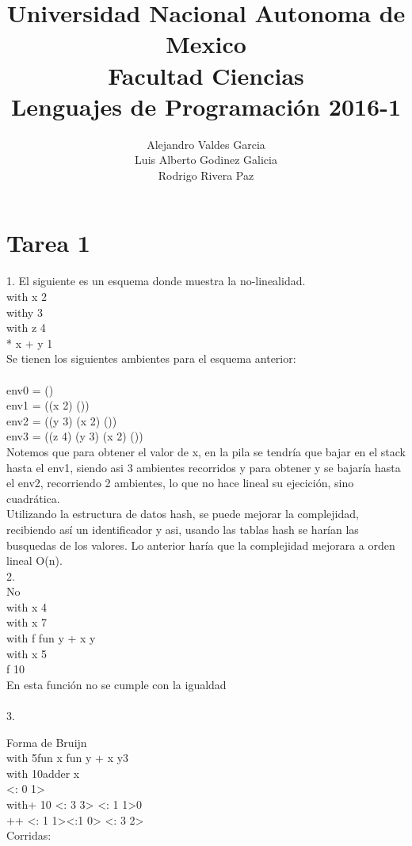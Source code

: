 \documentclass[a4paper]{article}
\title{Universidad Nacional Autonoma de Mexico \\
 Facultad Ciencias\\
 Lenguajes de Programación 2016-1}
\author{ Alejandro Valdes Garcia  \\ Luis Alberto Godinez Galicia\\
  Rodrigo Rivera Paz}
\begin{document}
\maketitle



\section{Tarea 1}

1.
El siguiente es un esquema donde muestra la no-linealidad. \\
{with {x 2} \\
	{with{y 3} \\
		{with {z 4} \\
			{* x {+ y 1}}}}} \\
		
Se tienen los siguientes ambientes para el esquema anterior: \\
 \\
env0 = () \\
env1 = ((x 2) ()) \\
env2 = ((y 3) (x 2) ()) \\
env3 = ((z 4) (y 3) (x 2) ()) \\

Notemos que para obtener el valor de x, en la pila se tendría que bajar en el stack
hasta el env1, siendo asi 3 ambientes recorridos y para obtener y se bajaría hasta
el env2, recorriendo 2 ambientes, lo que no hace lineal su ejecición, sino cuadrática.
 \\
Utilizando la estructura de datos hash, se puede mejorar la complejidad, recibiendo así
un identificador y asi, usando las tablas hash se harían las busquedas de los valores.
Lo anterior haría que la complejidad mejorara a orden lineal O(n). \\

2. \\
  No \\
  {with {x 4} \\
    {with {x 7} \\
      {with {f {fun {y} {+ x y}}} \\
        {with {x 5} \\
          {f 10}}}}} \\
          
  En esta función no se cumple con la igualdad \\
 \\
3.

Forma de Bruijn
 \\

{with {5{fun {x} {fun {y} { + x y}}}3 \\
   {with {10{adder x}  \\
	 {<: 0  1> \\
	  {with{+ 10 <: 3 3>} {<: 1 1>0} \\
	    {+{+ <: 1 1><:1 0>} <: 3 2>}}}}}}} \\
	    
		Corridas:
		
\end{document}
